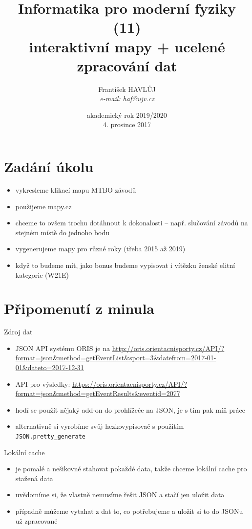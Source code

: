 \documentclass{beamer}
\title[IMF (11)]{Informatika pro moderní fyziky (11)\\ interaktivní mapy + ucelené zpracování dat}
\author[Franti\v{s}ek HAVL\r{U}J, ORF ÚJV Řež]{Franti\v{s}ek HAVL\r{U}J\\{\scriptsize \emph{e-mail: haf@ujv.cz}}}
\date{akademický rok 2019/2020\\4. prosince 2017}
\institute[ORF ÚJV Řež]
{ÚJV Řež\\oddělení Reaktorové fyziky a podpory palivového cyklu}
\begin{document}
\begin{frame}
  \titlepage
\end{frame}

\begin{frame}
  \tableofcontents
\end{frame}


\section{Zadání úkolu}

\begin{frame}{}
  \begin{itemize}
    \item vykresleme klikací mapu MTBO závodů
    \item použijeme mapy.cz
    \item chceme to ovšem trochu dotáhnout k dokonalosti – např. slučování závodů na stejném místě do jednoho bodu
    \item vygenerujeme mapy pro různé roky (třeba 2015 až 2019)
    \item když to budeme mít, jako bonus budeme vypisovat i vítězku ženské elitní kategorie (W21E)
  \end{itemize}
\end{frame}

\section{Připomenutí z minula}

\begin{frame}{Zdroj dat}
  \begin{itemize}
    \item JSON API systému ORIS je na \url{http://oris.orientacnisporty.cz/API/?format=json\&method=getEventList\&sport=3\&datefrom=2017-01-01\&dateto=2017-12-31}
    \item API pro výsledky: \url{https://oris.orientacnisporty.cz/API/?format=json&method=getEventResults&eventid=2077}
    \item hodí se použít nějaký add-on do prohlížeče na JSON, je s tím pak míň práce
    \item alternativně si vyrobíme svůj hezkovypisovač s použitím \texttt{JSON.pretty\_generate}
  \end{itemize}
\end{frame}

\begin{frame}{Lokální cache}
  \begin{itemize}
    \item je pomalé a nešikovné stahovat pokaždé data, takže chceme lokální cache pro stažená data
    \item uvědomíme si, že vlastně nemusíme řešit JSON a stačí jen uložit data
    \item případně můžeme vytahat z dat to, co potřebujeme a uložit si to do JSONu už zpracované
  \end{itemize}
\end{frame}
\end{document}

